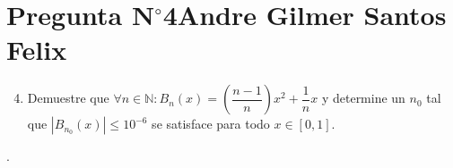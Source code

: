 \section{Pregunta N$^{\circ}$4\qquad Andre Gilmer Santos Felix}

\begin{frame}
	\begin{enumerate}\setcounter{enumi}{3}
		\item

		      Demuestre que
		      \begin{math}
			      \forall n\in\mathbb{N}:
			      B_{n}\left(x\right)=
			      \left(\dfrac{n-1}{n}\right)x^{2}+
			      \dfrac{1}{n}x
		      \end{math}
		      y determine un $n_{0}$ tal que
		      \begin{math}
			      \left|
			      B_{n_{0}}\left(x\right)
			      \right|\leq
			      10^{-6}
		      \end{math}
		      se satisface para todo $x\in\left[0,1\right]$.
	\end{enumerate}

	\begin{solution}
		.
	\end{solution}
\end{frame}
